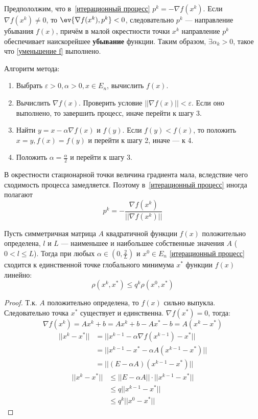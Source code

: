 Предпололжим, что в~\eqref{итерационный процесс} \(p^k = - \nabla f(x^k)\). Если \(\nabla f(x^k) \neq 0\), то \(\ev{\nabla f(x^k), p^k} < 0\), следовательно \(p^k\) --- направление убывания \(f(x)\), причём в малой окрестности точки \(x^k\) направление \(p^k\) обеспечивает наискорейшее \textbf{убывание} функции. Таким образом, \(\exists \alpha_k > 0\), такое что \eqref{уменьшение f} выполнено.

Алгоритм метода:
\begin{enumerate}
    \item Выбрать \(\varepsilon > 0, \alpha > 0, x\in E_n\), вычислить \(f(x)\).
    \item Вычислить \(\nabla f(x)\). Проверить условие \(||\nabla f(x)|| < \varepsilon\). Если оно выполнено, то завершить процесс, иначе перейти к шагу 3.
    \item Найти \(y = x - \alpha \nabla f(x)\) и \(f(y)\). Если \(f(y) < f(x)\), то положить \(x = y, f(x) = f(y)\) и перейти к шагу 2, иначе --- к 4.
    \item Положить \(\alpha = \frac{\alpha}{2}\) и перейти к шагу 3.
\end{enumerate}

\begin{remark}
    В окрестности стационарной точки величина градиента мала, вследствие чего сходимость процесса замедляется. Поэтому в~\eqref{итерационный процесс} иногда полагают
    \[p^k = - \frac{\nabla f(x^k)}{||\nabla f(x^k)||}\]
\end{remark}

\begin{theorem}
    Пусть симметричная матрица \(A\) квадратичной функции \(f(x)\) положительно определена, \(l\) и \(L\) --- наименьшее и наибольшее собственные значения \(A\) (\(0 < l \leq L\)). Тогда при любых \(\alpha \in \left( 0, \frac{2}{L} \right)\) и \(x^0 \in E_n\) \eqref{итерационный процесс} сходится к единственной точке глобального минимума \(x^*\) функции \(f(x)\) линейно:
    \[\rho(x^k, x^*) \leq q^k \rho(x^0, x^*)\]
\end{theorem}
\begin{proof}
    Т.к. \(A\) положительно определена, то \(f(x)\) сильно выпукла. Следовательно точка \(x^*\) существует и единственна. \(\nabla f(x^*) = 0\), тогда:
    \[\nabla f(x^k) = Ax^k + b = Ax^k + b - Ax^* - b = A(x^k - x^*)\]
    \begin{align*}
        ||x^k - x^*|| & = ||x^{k - 1} - \alpha \nabla f(x^{k - 1}) - x^*|| \\
                      & = ||x^{k - 1} - x^* - \alpha A(x^{k - 1} - x^*)||  \\
                      & = ||(E - \alpha A)(x^{k - 1} - x^*)||
    \end{align*}
    \begin{align*}
        ||x^k - x^*|| & \leq ||E - \alpha A|| \cdot ||x^{k - 1} - x^*|| \\
                      & \leq q ||x^{k - 1} - x^*||                      \\
                      & \leq q^k ||x^0 - x^*||
    \end{align*}
\end{proof}

